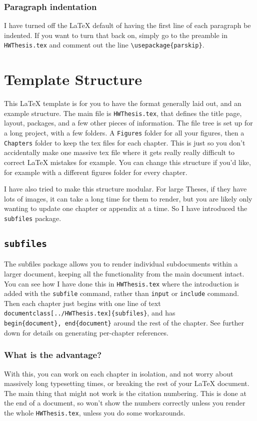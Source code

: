 \documentclass[../HWThesis.tex]{subfiles} %
\begin{document}
\begin{refsection}
\subsubsection{Paragraph indentation} I have turned off the LaTeX default of having the first line of each paragraph be indented. If you want to turn that back on, simply go to the preamble in \texttt{HWThesis.tex} and comment out the line \texttt{\textbackslash usepackage\{parskip\}}.

\section{Template Structure}
This LaTeX template is for you to have the format generally laid out, and an example structure. The main file is \texttt{HWThesis.tex}, that defines the title page, layout, packages, and a few other pieces of information. The file tree is set up for a long project, with a few folders. A \texttt{Figures} folder for all your figures, then a \texttt{Chapters} folder to keep the tex files for each chapter. This is just so you don't accidentally make one massive tex file where it gets really really difficult to correct LaTeX mistakes for example. You can change this structure if you'd like, for example with a different figures folder for every chapter. 

I have also tried to make this structure modular. For large Theses, if they have lots of images, it can take a long time for them to render, but you are likely only wanting to update one chapter or appendix at a time. So I have introduced the \texttt{subfiles} package. 

\subsection{\texttt{subfiles}}
The subfiles package allows you to render individual subdocuments within a larger document, keeping all the functionality from the main document intact. You can see how I have done this in \texttt{HWThesis.tex} where the introduction is added with the \texttt{subfile} command, rather than \texttt{input} or \texttt{include} command. Then each chapter just begins with one line of text\texttt{ \\documentclass[../HWThesis.tex]\{subfiles\}}, and has \\ \texttt{begin\{document\}, end\{document\}} around the rest of the chapter. See further down for details on generating per-chapter references.

\subsubsection{What is the advantage?}
With this, you can work on each chapter in isolation, and not worry about massively long typesetting times, or breaking the rest of your LaTeX document. The main thing that might not work is the citation numbering. This is done at the end of a document, so won't show the numbers correctly unless you render the whole \texttt{HWThesis.tex}, unless you do some workarounds. 


\end{refsection}
\end{document}
